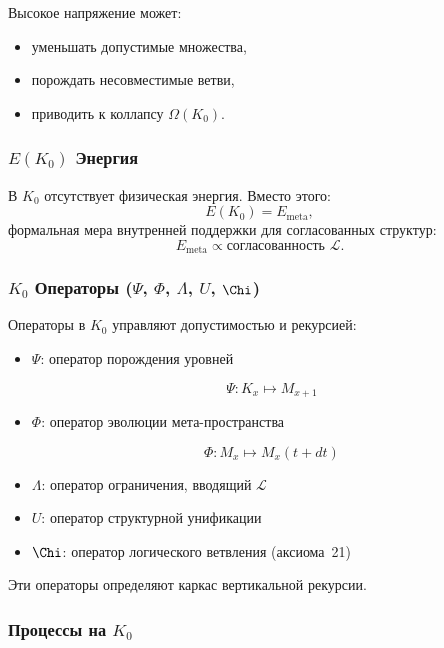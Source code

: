 Высокое напряжение может:
\begin{itemize}
    \item уменьшать допустимые множества,
    \item порождать несовместимые ветви,
    \item приводить к коллапсу $\Omega(K_0)$.
\end{itemize}

\subsubsection{\texorpdfstring{$E(K_0)$}{E(K_0)} Энергия}

В $K_0$ отсутствует физическая энергия.
Вместо этого:
\[
E(K_0) = E_{\mathrm{meta}},
\]
формальная мера внутренней поддержки для согласованных структур:
\[
E_{\mathrm{meta}} \propto \text{согласованность }\mathcal{L}.
\]

\subsubsection{\texorpdfstring{$K_0$}{K_0} Операторы (\texorpdfstring{$\Psi$}{\Psi}, \texorpdfstring{$\Phi$}{\Phi}, \texorpdfstring{$\Lambda$}{\Lambda}, \texorpdfstring{$U$}{U}, \texorpdfstring{$\Chi$}{\Chi})}

Операторы в $K_0$ управляют допустимостью и рекурсией:

\begin{itemize}
    \item $\Psi$: оператор порождения уровней

          \[
          \Psi: K_x \mapsto M_{x+1}
          \]
    \item $\Phi$: оператор эволюции мета-пространства

          \[
          \Phi: M_x \mapsto M_x(t+dt)
          \]
    \item $\Lambda$: оператор ограничения, вводящий $\mathcal{L}$
    \item $U$: оператор структурной унификации
    \item $\Chi$: оператор логического ветвления (аксиома~21)
\end{itemize}

Эти операторы определяют каркас вертикальной рекурсии.

\subsubsection{Процессы на \texorpdfstring{$K_0$}{K_0}}

